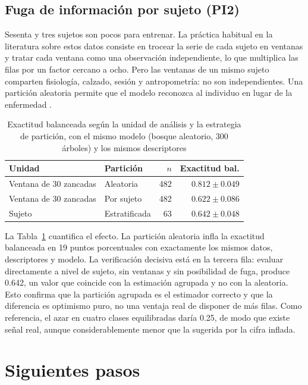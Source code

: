 \documentclass[conference]{IEEEtran}
\begin{document}
\subsection{Fuga de información por sujeto (PI2)}
\label{sec:fuga}

Sesenta y tres sujetos son pocos para entrenar. La práctica habitual en la literatura sobre estos datos consiste en trocear la serie de cada sujeto en ventanas y tratar cada ventana como una observación independiente, lo que multiplica las filas por un factor cercano a ocho. Pero las ventanas de un mismo sujeto comparten fisiología, calzado, sesión y antropometría: no son independientes. Una partición aleatoria permite que el modelo reconozca al individuo en lugar de la enfermedad \cite{saeb2017}.

\begin{table}[t]
\caption{Exactitud balanceada según la unidad de análisis y la estrategia de partición, con el mismo modelo (bosque aleatorio, 300 árboles) y los mismos descriptores}
\label{tab:leakage}
\centering
\begin{tabular}{llrr}
\toprule
Unidad & Partición & $n$ & Exactitud bal. \\
\midrule
Ventana de 30 zancadas & Aleatoria      & 482 & $0.812 \pm 0.049$ \\
Ventana de 30 zancadas & Por sujeto     & 482 & $0.622 \pm 0.086$ \\
Sujeto                 & Estratificada  & 63  & $0.642 \pm 0.048$ \\
\bottomrule
\end{tabular}
\end{table}

La Tabla~\ref{tab:leakage} cuantifica el efecto. La partición aleatoria infla la exactitud balanceada en 19 puntos porcentuales con exactamente los mismos datos, descriptores y modelo. La verificación decisiva está en la tercera fila: evaluar directamente a nivel de sujeto, sin ventanas y sin posibilidad de fuga, produce 0.642, un valor que coincide con la estimación agrupada y no con la aleatoria. Esto confirma que la partición agrupada es el estimador correcto y que la diferencia es optimismo puro, no una ventaja real de disponer de más filas. Como referencia, el azar en cuatro clases equilibradas daría 0.25, de modo que existe señal real, aunque considerablemente menor que la sugerida por la cifra inflada.

\section{Siguientes pasos}
\end{document}

